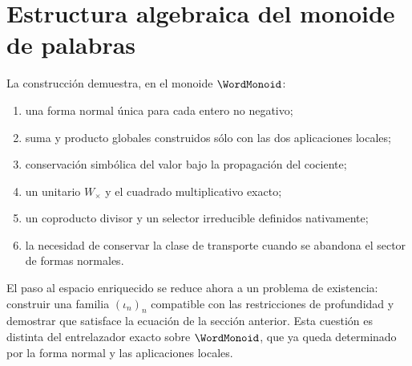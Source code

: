 \section{Estructura algebraica del monoide de palabras}

La construcción demuestra, en el monoide \(\WordMonoid\):
\begin{enumerate}
 \item una forma normal única para cada entero no negativo;
 \item suma y producto globales construidos sólo con las dos aplicaciones locales;
 \item conservación simbólica del valor bajo la propagación del cociente;
 \item un unitario $W_\times$ y el cuadrado multiplicativo exacto;
 \item un coproducto divisor y un selector irreducible definidos nativamente;
 \item la necesidad de conservar la clase de transporte cuando se abandona el
 sector de formas normales.
\end{enumerate}

El paso al espacio enriquecido se reduce ahora a un problema de existencia:
construir una familia \((\iota_n)_n\) compatible con las restricciones de
profundidad y demostrar que satisface la ecuación de la sección anterior.
Esta cuestión es distinta del entrelazador exacto sobre
\(\WordMonoid\), que ya queda determinado por la forma normal y las
aplicaciones locales.
